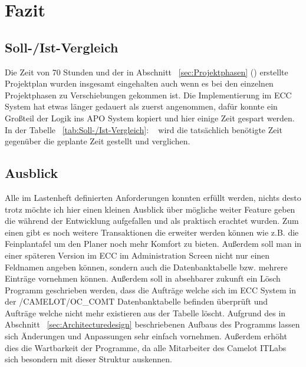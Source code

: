 \section{Fazit} 
\label{sec:Fazit}

\subsection{Soll-/Ist-Vergleich}
\label{sec:SollIstVergleich}
Die Zeit von 70 Stunden und der in Abschnitt ~\ref{sec:Projektphasen} () erstellte Projektplan wurden insgesamt eingehalten auch wenn es bei den einzelnen Projektphasen zu Verschiebungen gekommen ist. Die Implementierung im \ac{ECC} System hat etwas länger gedauert als zuerst angenommen, dafür konnte ein Großteil der Logik ins \ac{APO} System kopiert und hier einige Zeit gespart werden. In der Tabelle ~\ref{tab:Soll-/Ist-Vergleich}: ~ wird die tatsächlich benötigte Zeit gegenüber die geplante Zeit gestellt und verglichen.

\subsection{Ausblick}
\label{sec:Ausblick}
Alle im Lastenheft definierten Anforderungen konnten erfüllt werden, nichts desto trotz möchte ich hier einen kleinen Ausblick über mögliche weiter Feature geben die während der Entwicklung aufgefallen und als praktisch erachtet wurden. Zum einen gibt es noch weitere Transaktionen die erweiter werden können wie z.B. die Feinplantafel um den Planer noch mehr Komfort zu bieten. Außerdem soll man in einer späteren Version im \ac{ECC} im Administration Screen nicht nur einen Feldnamen angeben können, sondern auch die Datenbanktabelle bzw. mehrere Einträge vornehmen können. Außerdem soll in absehbarer zukunft ein Lösch Programm geschrieben werden, dass die Aufträge welche sich im ECC System in der /CAMELOT/OC\_COMT Datenbanktabelle befinden überprüft und Aufträge welche nicht mehr existieren aus der Tabelle löscht. Aufgrund des in Abschnitt ~\ref{sec:Architecturedesign} beschriebenen Aufbaus des Programms lassen sich Änderungen und Anpassungen sehr einfach vornehmen. Außerdem erhöht dies die Wartbarkeit der Programme, da alle Mitarbeiter des Camelot ITLabs sich besondern mit dieser Struktur auskennen. 
